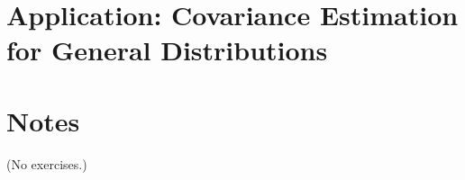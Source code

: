 \documentclass{report}
\theoremstyle{definition}
\newenvironment{exercise}[1]{
  \renewcommand\theexerciseimpl{#1}
  \exerciseimpl
}{\endexerciseimpl}
\begin{document}
\begin{exercise}{5.5.1}
\end{exercise}

\begin{exercise}{5.5.2}
\end{exercise}

\section{Application: Covariance Estimation for General Distributions}

\begin{exercise}{5.6.4}
\end{exercise}

\begin{exercise}{5.6.5}
\end{exercise}

\begin{exercise}{5.6.6}
\end{exercise}

\begin{exercise}{5.6.7}
\end{exercise}

\begin{exercise}{5.6.8}
\end{exercise}

\section{Notes}

(No exercises.)
\end{document}

